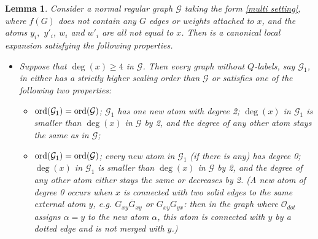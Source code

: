 \documentclass{article}
\newcommand{\1}{\mathds{1}}
\numberwithin{equation}{section}
\newcommand{\ord}{{\rm{ord}}}
\newcommand{\al}{\alpha}
\renewcommand{\cal}{\mathcal}
\renewcommand{\geq}{\geqslant}
\renewcommand{\ge}{\geq}
\theoremstyle{plain} %
\newtheorem{lemma}[theorem]{Lemma}
\theoremstyle{remark}
\newcommand{\cor}{\color{red}}
\newcommand{\hty}[1]{{\cor (ht: #1) }}
\begin{document}
\begin{lemma}\label{expandmulti}
Consider a normal regular graph $\cal G$ taking the form \eqref{multi setting}, where $f (G)$ does not contain any $G$ edges or weights attached to $x$, and the atoms $y_i,$ $y'_i$, $w_i$ and $w'_i$ are all not equal to $x$. Then \smash{${\cal O}_{multi-e}^{(x)}[\cal G]$} is a canonical local expansion satisfying the following properties. 
\begin{itemize}
\item[(a)] %
Suppose that $\deg(x)\ge 4$ in $\cal G$. Then every graph without $Q$-labels, say $\cal G_1$, in \smash{${\cal O}_{multi-e}^{(x)}[\cal G]$} either has a strictly higher scaling order than $\cal G$ or satisfies one of the following two properties:
\begin{itemize}
\item[(a.1)] %
$\ord(\cal G_1)= \ord(\cal G)$; $\cal G_1$ has one new atom with degree 2;  $\deg(x)$ in $\cal G_1$ is smaller than $\deg(x)$ in $\cal G$ by 2, and the degree of any other atom stays the same as in $\cal G$;
\item[(a.2)] %
$\ord(\cal G_1)= \ord(\cal G)$; every new atom in $\cal G_1$ (if there is any) has degree 0; $\deg(x)$ in $\cal G_1$ is smaller than $\deg(x)$ in $\cal G$ by 2, and the degree of any other atom either stays the same or decreases by 2. (A new atom of degree 0 occurs when $x$ is connected with two solid edges to the same external atom $y$, e.g. $G_{xy}\overline G_{xy}$ or $G_{xy}G_{yx}$: then in the graph where $\cal O_{dot}$ assigns $\al=y$ to the new atom $\al$, this atom is connected with $y$ by a dotted edge and is not merged with $y$.)

\end{itemize}
\end{itemize}
\end{lemma}
\end{document}
